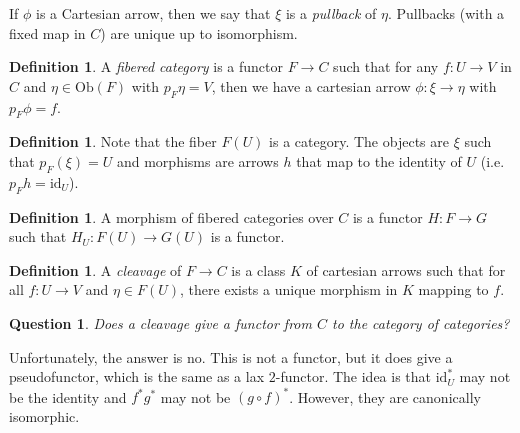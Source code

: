 \documentclass[leqno, openany]{memoir}
\newtheorem{quest}[thm]{Question}
\theoremstyle{definition}
\newtheorem{defn}[thm]{Definition}
\theoremstyle{remark}
\theoremstyle{plain}
\theoremstyle{definition}
\theoremstyle{remark}
\newcommand{\mr}[1]{\mathrm{#1}}
\begin{document}
If $\phi$ is a Cartesian arrow, then we say that $\xi$ is a \textit{pullback}
of $\eta$. Pullbacks (with a fixed map in $C$) are unique up to isomorphism.

\begin{defn} A \textit{fibered category} is a functor $F \to C$ such that for
any $f \colon U \to V$ in $C$ and $\eta \in \mr{Ob}(F)$ with $p_F \eta = V$,
then we have a cartesian arrow $\phi \colon \xi \to \eta$ with $p_F \phi = f$.
\end{defn}

\begin{defn} Note that the fiber $F(U)$ is a category. The objects are $\xi$
such that $p_F(\xi) = U$ and morphisms are arrows $h$ that map to the identity
of $U$ (i.e. $p_F h = \mr{id}_U$).  \end{defn}

\begin{defn} A morphism of fibered categories over $C$ is a functor $H \colon F
\to G$ such that $H_U \colon F(U) \to G(U)$ is a functor.  \end{defn}

\begin{defn} A \textit{cleavage} of $F \to C$ is a class $K$ of cartesian
arrows such that for all $f \colon U \to V$ and $\eta \in F(U)$, there exists a
unique morphism in $K$ mapping to $f$.  \end{defn}

\begin{quest} Does a cleavage give a functor from $C$ to the category of
categories?  \end{quest}

Unfortunately, the answer is no. This is not a functor, but it does give a
pseudofunctor, which is the same as a lax $2$-functor. The idea is that
$\mr{id}_U^*$ may not be the identity and $f^* g^*$ may not be $(g \circ f)^*$.
However, they are canonically isomorphic.
\end{document}

